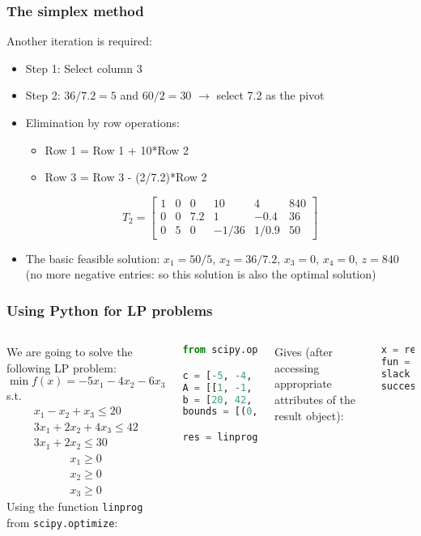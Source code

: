 \begin{frame}
  \frametitle{The simplex method}
  Another iteration is required:
  \begin{itemize}
    \item Step 1: Select column 3
    \item Step 2: $36/7.2 = 5$ and $60/2 = 30$ $\longrightarrow$ select 7.2 as the pivot
    \item Elimination by row operations:
    \begin{itemize}
      \item Row 1 = Row 1 + 10*Row 2
      \item Row 3 = Row 3 - (2/7.2)*Row 2
    \end{itemize}
       \[
T_2 = \begin{bmatrix}
1 & 0 & 0 & 10 & 4 & 840\\ 
0 & 0 & 7.2 & 1 & -0.4 & 36\\
0 & 5 & 0 & -1/36 & 1/0.9 &50 
\end{bmatrix}
   \]
    \item The basic feasible solution: $x_1 = 50/5$, $x_2 = 36/7.2$, $x_3 = 0$, $x_4 = 0$, $z=840$ (no more negative entries: so this solution is also the optimal solution)
  \end{itemize}
\end{frame}

\begin{frame}[fragile]
  \frametitle{Using Python for LP problems}
  \begin{columns}
    We are going to solve the following LP problem:\\
    \[
    \min f(x) = -5x_1 -4x_2 - 6x_3 
    \] 
    s.t. \\
    \[
    \begin{array}{l}
    x_1 - x_2 + x_3 \leq 20 \\
    3x_1 + 2x_2 + 4x_3 \leq 42 \\
    3x_1 + 2x_2 \leq 30 
    \end{array}
    \]
    \[
    \begin{array}{l}
    x_1 \geq 0 \\
    x_2 \geq 0 \\
    x_3 \geq 0
    \end{array}
    \]
    Using the function \texttt{linprog} from \texttt{scipy.optimize}:
    \begin{lstlisting}[language=Python]
from scipy.optimize import linprog

c = [-5, -4, -6]
A = [[1, -1, 1], [3, 2, 4], [3, 2, 0]]
b = [20, 42, 30]
bounds = [(0, None), (0, None), (0, None)]

res = linprog(c, A_ub=A, b_ub=b, bounds=bounds)
    \end{lstlisting}
Gives (after accessing appropriate attributes of the result object):
    \begin{lstlisting}[language=Python]
x = res.x
fun = res.fun
slack = res.slack
success = res.success
    \end{lstlisting}
  \end{columns}
\end{frame}


